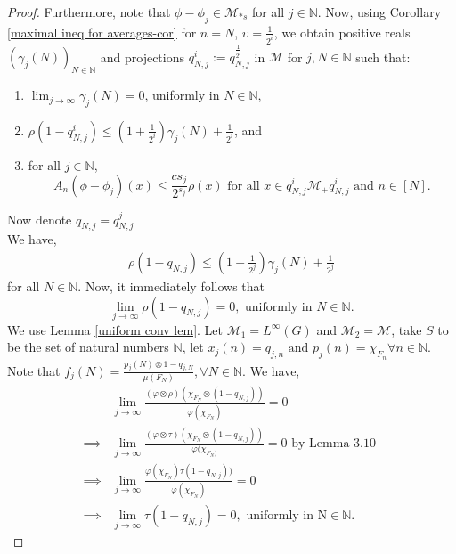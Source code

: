 \documentclass[10pt,a4paper]{amsart}
\newcommand{\CM}{\mathcal{M}}
\begin{document}
\begin{proof}
		Furthermore, note that $\phi - \phi_j \in \mathcal{M}_{*s}$ for all $j \in \mathbb{N}$. Now, using Corollary \ref{maximal ineq for averages-cor} for $n = N$, $\upsilon = \frac{1}{2^i}$, we obtain positive reals $({\gamma_j(N)})_{N \in \mathbb{N}}$ and projections $ q_{N,j}^{i} := q^{ \frac{1}{2^i}}_{ N, j} $ in $\mathcal{M}$ for $ j , N \in \mathbb{N}$ such that:
		\begin{enumerate}\setlength\itemsep{.7em}
			\item $ \displaystyle \lim_{j \to \infty} \gamma_j(N) = 0$, uniformly in $N \in \mathbb{N}$,   
			\item $ \rho(1- q^{i}_{N,j}) \leq ( 1+ \frac{1}{2^i})\gamma_j(N) + \frac{1}{2^i} $, and
			\item for all $j \in \mathbb{N}$, 
			\[
			A_n(\phi - \phi_j)(x) \leq  \frac{cs_j}{2^{s_j}}  \rho(x) \text{ for all } x \in q^{i}_{N,j} \mathcal{M}_+ q^{i}_{N, j} \text{ and } n \in [N].
			\]
		\end{enumerate}
        Now denote $q_{N,j} = q^{j}_{N,j}$ \\
        We have,
        \begin{align*}
        \rho(1-q_{N,j}) \leq (1+ \frac{1}{2^j})\gamma_j(N) + \frac{1}{2^j}
        \end{align*} for all $N \in \mathbb{N}$.
		Now, it immediately follows that
		\[
		\displaystyle \lim_{j \to \infty}  \rho(1- q_{N, j}) = 0, \text{ uniformly in }  N \in \mathbb{N}. 
		\]
		We use Lemma \ref{uniform conv lem}. Let $\CM_{1}=L^{\infty}(G)$ and $\CM_{2}=\CM$, take $S$ to be the set of natural numbers $\mathbb{N}$, let  $x_{j}(n)=q_{j,n} \text{ and } p_{j}(n)=\chi_{F_{n}}  \forall n \in \mathbb{N}$. Note that $f_{j}(N)=\frac{p_{j}(N) \otimes 1-q_{j,N}}{\mu(F_{N})},\forall N \in \mathbb{N}$. We have,
        \begin{align*}
        &\lim_{j \rightarrow \infty}\frac{(\varphi \otimes \rho)(\chi_{F_{N}}\otimes(1-q_{N,j}))}{\varphi(\chi_{F_{N}})} = 0 \\
        \implies & \lim_{j \rightarrow \infty}\frac{(\varphi \otimes \tau)(\chi_{F_{N}}\otimes(1-q_{N,j}))}{\varphi(\chi_{F_{N})}} = 0 \text{ by Lemma 3.10 } \\
        \implies & \lim_{j \rightarrow \infty}\frac{\varphi(\chi_{F_{N}})\tau(1-q_{N,j}))}{\varphi(\chi_{F_{N}})} = 0 \\
        \implies & \lim_{j \rightarrow \infty}\tau(1-q_{N,j})=0, \text{ uniformly in N}\in \mathbb{N}.
        \end{align*}
		

\end{proof}
\end{document}
